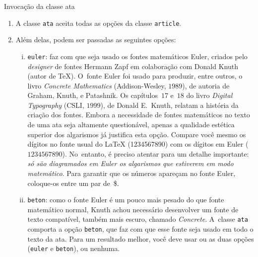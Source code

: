 \documentclass[12pt,a4paper,euler,beton]{ata}
\begin{document}
\begin{ponto}[opcoes]{Invocação da classe ata}

  \begin{enumerate}

  \item A classe \texttt{ata} aceita todas as opções da classe
    \texttt{article}.

  \item \label{fonts} Além delas, podem ser passadas as seguintes
    opções:

    \begin{enumerate}[(i)]

    \item \texttt{euler}: faz com que seja usado os fontes matemáticos
      Euler, criados pelo \emph{designer} de fontes Hermann Zapf em
      colaboração com Donald Knuth (autor de \TeX). O~fonte Euler foi
      usado para produzir, entre outros, o livro \emph{Concrete
        Mathematics} (Addison-Wesley, $1989$), de autoria de Graham,
      Knuth, e Patashnik. Os capítulos~$17$ e~$18$ do livro
      \emph{Digital Typography} (CSLI, $1999$), de Donald E.~Knuth,
      relatam a história da criação dos fontes. Embora a necessidade
      de fontes matemáticos no texto de uma ata seja altamente
      questionável, apenas a qualidade estética superior dos
      algarismos já justifica esta opção. Compare você mesmo os
      dígitos no fonte usual do \LaTeX{} (1234567890) com os dígitos
      em Euler ($1234567890$). No~entanto, é preciso atentar para um
      detalhe importante: \emph{só são diagramados em Euler os
        algarismos que estiverem em modo matemático}. Para garantir
      que os números apareçam no fonte Euler, coloque-os entre um par
      de~\$.

    \item \texttt{beton}: como o fonte Euler é um pouco mais pesado do
      que fonte matemático normal, Knuth achou necessário desenvolver
      um fonte de texto compatível, também mais escuro, chamado
      \emph{Concrete}. A~classe \texttt{ata} comporta a opção
      \texttt{beton}, que faz com que esse fonte seja usado em todo o
      texto da ata. Para um resultado melhor, você deve usar ou as
      duas opções (\texttt{euler} e \texttt{beton}), ou nenhuma.

    \end{enumerate}
    
  \end{enumerate}

\end{ponto}
\end{document}
